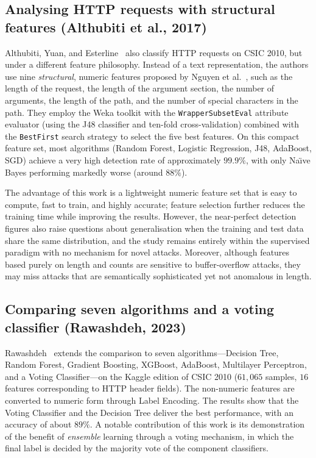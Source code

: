 \documentclass[../main.tex]{subfiles}
\begin{document}
\subsection{Analysing HTTP requests with structural features
(Althubiti et al., 2017)}

Althubiti, Yuan, and Esterline~\cite{althubiti2017} also classify HTTP
requests on CSIC 2010, but under a different feature philosophy. Instead of
a text representation, the authors use nine \emph{structural}, numeric
features proposed by Nguyen et al.~\cite{nguyen2011}, such as the length of
the request, the length of the argument section, the number of arguments,
the length of the path, and the number of special characters in the path.
They employ the Weka toolkit with the \texttt{WrapperSubsetEval} attribute
evaluator (using the J48 classifier and ten-fold cross-validation) combined
with the \texttt{BestFirst} search strategy to select the five best
features. On this compact feature set, most algorithms (Random Forest,
Logistic Regression, J48, AdaBoost, SGD) achieve a very high detection
rate of approximately $99.9\%$, with only Na\"{\i}ve Bayes performing
markedly worse (around $88\%$).

The advantage of this work is a lightweight numeric feature set that is
easy to compute, fast to train, and highly accurate; feature selection
further reduces the training time while improving the results. However,
the near-perfect detection figures also raise questions about
generalisation when the training and test data share the same
distribution, and the study remains entirely within the supervised
paradigm with no mechanism for novel attacks. Moreover, although features
based purely on length and counts are sensitive to buffer-overflow
attacks, they may miss attacks that are semantically sophisticated yet not
anomalous in length.

\subsection{Comparing seven algorithms and a voting classifier
(Rawashdeh, 2023)}

Rawashdeh~\cite{rawashdeh2023} extends the comparison to seven
algorithms---Decision Tree, Random Forest, Gradient Boosting, XGBoost,
AdaBoost, Multilayer Perceptron, and a Voting Classifier---on the Kaggle
edition of CSIC 2010 ($61{,}065$ samples, $16$ features corresponding to
HTTP header fields). The non-numeric features are converted to numeric
form through Label Encoding. The results show that the Voting Classifier
and the Decision Tree deliver the best performance, with an accuracy of
about $89\%$. A notable contribution of this work is its demonstration of
the benefit of \emph{ensemble} learning through a voting mechanism, in
which the final label is decided by the majority vote of the component
classifiers.
\end{document}
